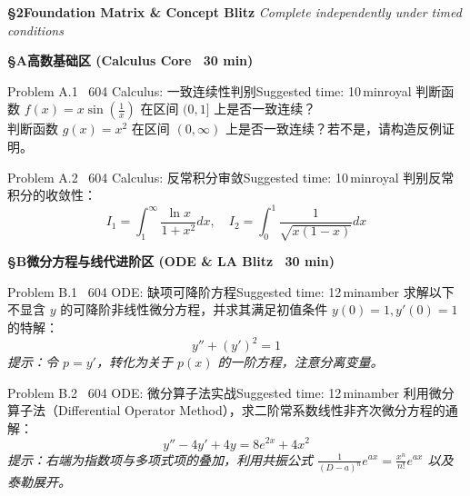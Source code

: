 \documentclass[a4paper,11pt]{article}
\begin{document}
{\Large\sffamily\bfseries\color{navy} \S 2\quad Foundation Matrix \& Concept Blitz}
\hfill{\small\sffamily\color{mist}\itshape Complete independently under timed conditions}

\vspace{6pt}

{\normalsize\sffamily\bfseries\color{royal} \S A\quad 高数基础区 (Calculus Core \textperiodcentered\ 30 min)}
\vspace{2pt}

\begin{problembox}{Problem A.1 \textbar\ 604 Calculus: 一致连续性判别}{Suggested time: 10\,min}{royal}
判断函数 $f(x) = x \sin\left(\frac{1}{x}\right)$ 在区间 $(0, 1]$ 上是否一致连续？\\
判断函数 $g(x) = x^2$ 在区间 $(0, \infty)$ 上是否一致连续？若不是，请构造反例证明。
\end{problembox}
\vspace{6.5cm}

\begin{problembox}{Problem A.2 \textbar\ 604 Calculus: 反常积分审敛}{Suggested time: 10\,min}{royal}
判别反常积分的收敛性：
\[
  I_1 = \int_1^{\infty} \frac{\ln x}{1+x^2} dx, \quad I_2 = \int_0^1 \frac{1}{\sqrt{x(1-x)}} dx
\]
\end{problembox}
\vspace{6.5cm}

\clearpage

{\normalsize\sffamily\bfseries\color{amber} \S B\quad 微分方程与线代进阶区 (ODE \& LA Blitz \textperiodcentered\ 30 min)}
\vspace{2pt}

\begin{problembox}{Problem B.1 \textbar\ 604 ODE: 缺项可降阶方程}{Suggested time: 12\,min}{amber}
求解以下不显含 $y$ 的可降阶非线性微分方程，并求其满足初值条件 $y(0)=1, y'(0)=1$ 的特解：
\[
  y'' + (y')^2 = 1
\]
\textit{提示：令 $p = y'$，转化为关于 $p(x)$ 的一阶方程，注意分离变量。}
\end{problembox}
\vspace{8.5cm}

\begin{problembox}{Problem B.2 \textbar\ 604 ODE: 微分算子法实战}{Suggested time: 12\,min}{amber}
利用微分算子法（Differential Operator Method），求二阶常系数线性非齐次微分方程的通解：
\[
  y'' - 4y' + 4y = 8e^{2x} + 4x^2
\]
\textit{提示：右端为指数项与多项式项的叠加，利用共振公式 $\frac{1}{(D-a)^n} e^{ax} = \frac{x^n}{n!} e^{ax}$ 以及泰勒展开。}
\end{problembox}
\vspace{8.5cm}
\end{document}
